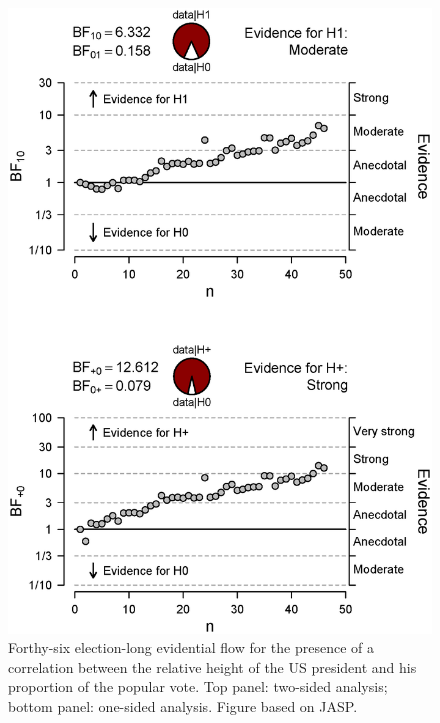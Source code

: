 \begin{figure}
    \begin{center}
        \includegraphics[width=.8\textwidth]{figs/bi1_PresidentsSequential.eps}
        \caption{Forthy-six election-long evidential flow for the presence of a correlation between the relative height of the US president and his proportion of the popular vote. Top panel: two-sided analysis; bottom panel: one-sided analysis. Figure based on JASP.}\label{fig:bi1:PresidentsSequential}
    \end{center}
\end{figure}

